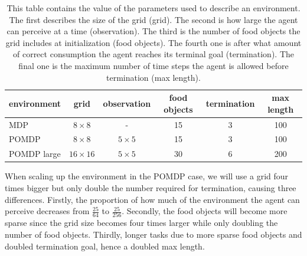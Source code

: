 \documentclass[12pt,A4]{report}
\theoremstyle{definition}
\begin{document}
\begin{table}[H]
  \centering
  \caption{This table contains the value of the parameters used to describe an environment. The first describes the size of the grid (grid). The second is how large the agent can perceive at a time (observation). The third is the number of food objects the grid includes at initialization (food objects). The fourth one is after what amount of correct consumption the agent reaches its terminal goal (termination). The final one is the maximum number of time steps the agent is allowed before termination (max length).}
  \begin{tabular}{l | c | c | c | c | c}
    environment & grid & observation & food objects & termination & max length\\ \hline
    MDP & $8 \times 8$ & - & 15 & 3 & 100\\
    POMDP & $8 \times 8$ & $5 \times 5$ & 15 & 3 & 100\\
    POMDP large & $16 \times 16$ & $5 \times 5$ & 30 & 6 & 200\\
  \end{tabular}
  \label{tab:sim_parms}
\end{table}

When scaling up the environment in the POMDP case, we will use a grid four times bigger but only double the number required for termination, causing three differences. Firstly, the proportion of how much of the environment the agent can perceive decreases from $\frac{25}{64}$ to $\frac{25}{256}$. Secondly, the food objects will become more sparse since the grid size becomes four times larger while only doubling the number of food objects. Thirdly, longer tasks due to more sparse food objects and doubled termination goal, hence a doubled max length.
\end{document}
